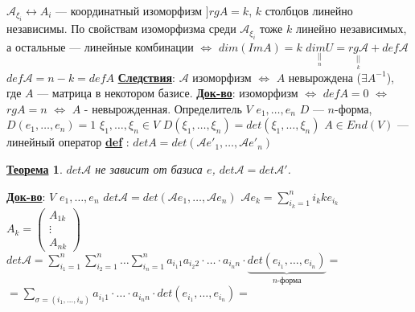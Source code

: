 \documentclass[12pt,a4paper]{article}
\newcommand{\bfline}[1]{\textbf{\underline{#1}}}
\newcommand{\Def}{\bfline{def} }
\newtheorem*{theorem*}{\bfline{Теорема}}
\begin{document}
$\mathcal{A}_{\xi_i} \leftrightarrow A_i$ --- координатный изоморфизм \newline
$] rgA = k$, $k$ столбцов линейно независимы. По свойствам изоморфизма среди $\mathcal{A}_{\xi_i}$ тоже $k$ линейно независимых, а остальные --- линейные комбинации $\Leftrightarrow$ $dim(Im A) = k$ \newline
$\underset{\underset{n}{||}}{dim U} = \underset{\underset{k}{||}}{rg \mathcal{A}} + def \mathcal{A}$ \newline
$def \mathcal{A} = n - k = def A$ \newline
\bfline{Следствия}: $\mathcal{A}$ изоморфизм $\Leftrightarrow$  $A$ невырождена ($\exists A^{-1}$), где $A$ --- матрица в некотором базисе. \newline
\bfline{Док-во}: изоморфизм $\Leftrightarrow$ $def A = 0$ $\Leftrightarrow$ $rg A = n$ $\Leftrightarrow$ $A$ - невырожденная. \newline
Определитель $V$ $e_1, \ldots, e_n$ \newline
$D$ --- $n$-форма, $D(e_1, \ldots, e_n) = 1$ \newline
$\xi_1, \ldots, \xi_n \in V$ $D(\xi_1, \ldots, \xi_n) = det(\xi_1, \ldots, \xi_n)$ \newline
$A \in End(V)$ --- линейный оператор \newline
\Def : $det A = det(\mathcal{A} e'_1, \ldots, \mathcal{A} e'_n)$ 
\begin{theorem*}
$det \mathcal{A}$ не зависит от базиса $e$, $det \mathcal{A} = det \mathcal{A}'$.
\end{theorem*}
\bfline{Док-во}: $V$ $e_1, \ldots, e_n$ \newline
$det \mathcal{A} = det(\mathcal{A} e_1, \ldots, \mathcal{A} e_n)$ \newline
$\mathcal{A} e_k = \sum\limits_{i_k = 1}^{n} i_k k e_{i_k}$ \newline
$A_k = \left(\begin{matrix}
A_{1 k} \\
\vdots \\
A_{n k}
\end{matrix}\right)$ \newline
$det \mathcal{A} = \sum\limits_{i_1=1}^{n} \sum\limits_{i_2=1}^{n} \ldots \sum\limits_{i_n=1}^{n} a_{i_1 1} a_{i_2 2} \cdot \ldots \cdot a_{i_n n} \cdot \underset{n\text{-форма}}{\underbrace{det(e_{i_1}, \ldots, e_{i_n})}}=$ \newline
$= \sum\limits_{\sigma=(i_1, \ldots, i_n)} a_{i_1 1} \cdot \ldots \cdot a_{i_n n} \cdot det(e_{i_1}, \ldots, e_{i_n})=$ \newline
\end{document}

